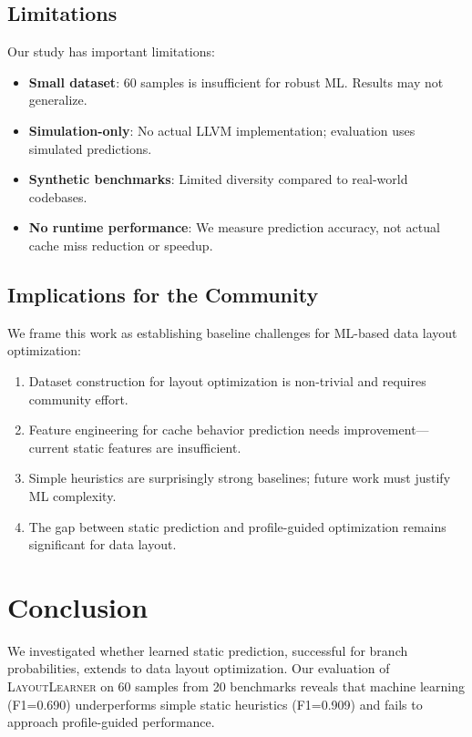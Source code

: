 \documentclass{article}
\begin{document}
\subsection{Limitations}

Our study has important limitations:
\begin{itemize}
    \item \textbf{Small dataset}: 60 samples is insufficient for robust ML. Results may not generalize.
    \item \textbf{Simulation-only}: No actual LLVM implementation; evaluation uses simulated predictions.
    \item \textbf{Synthetic benchmarks}: Limited diversity compared to real-world codebases.
    \item \textbf{No runtime performance}: We measure prediction accuracy, not actual cache miss reduction or speedup.
\end{itemize}

\subsection{Implications for the Community}

We frame this work as establishing baseline challenges for ML-based data layout optimization:
\begin{enumerate}
    \item Dataset construction for layout optimization is non-trivial and requires community effort.
    \item Feature engineering for cache behavior prediction needs improvement---current static features are insufficient.
    \item Simple heuristics are surprisingly strong baselines; future work must justify ML complexity.
    \item The gap between static prediction and profile-guided optimization remains significant for data layout.
\end{enumerate}

\section{Conclusion}
\label{sec:conclusion}

We investigated whether learned static prediction, successful for branch probabilities, extends to data layout optimization. Our evaluation of \textsc{LayoutLearner} on 60 samples from 20 benchmarks reveals that machine learning (F1=0.690) underperforms simple static heuristics (F1=0.909) and fails to approach profile-guided performance.
\end{document}
